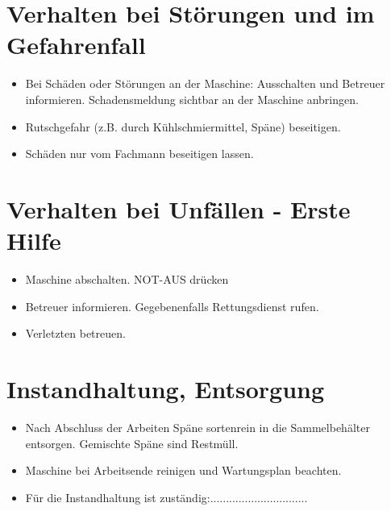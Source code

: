 \documentclass[fontsize=9pt]{scrartcl}
\newenvironment{smallitemize}{\begin{itemize}\itemsep -3pt}{\end{itemize}}
\begin{document}
\section{Verhalten bei Störungen und im Gefahrenfall}
\begin{smallitemize}
	\item Bei Schäden oder Störungen an der Maschine: Ausschalten und Betreuer informieren. Schadensmeldung sichtbar an der Maschine anbringen.
	\item Rutschgefahr (z.B. durch Kühlschmiermittel, Späne) beseitigen.
	\item Schäden nur vom Fachmann beseitigen lassen.
\end{smallitemize}

\section{Verhalten bei Unfällen - Erste Hilfe}
\begin{smallitemize}
	\item Maschine abschalten. NOT-AUS drücken
	\item Betreuer informieren. Gegebenenfalls Rettungsdienst rufen.
	\item Verletzten betreuen.
\end{smallitemize}

\section{Instandhaltung, Entsorgung}
\begin{smallitemize}
	\item Nach Abschluss der Arbeiten Späne sortenrein in die Sammelbehälter entsorgen. Gemischte Späne sind Restmüll.
	\item Maschine bei Arbeitsende reinigen und Wartungsplan beachten.
		\vspace{5mm}
	\item Für die Instandhaltung ist zuständig:...............................
\end{smallitemize}
\end{document}
